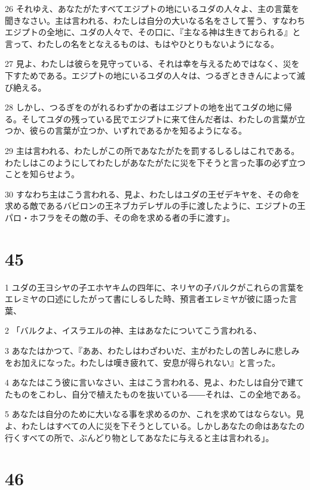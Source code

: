 \par 26 それゆえ、あなたがたすべてエジプトの地にいるユダの人々よ、主の言葉を聞きなさい。主は言われる、わたしは自分の大いなる名をさして誓う、すなわちエジプトの全地に、ユダの人々で、その口に、『主なる神は生きておられる』と言って、わたしの名をとなえるものは、もはやひとりもないようになる。
\par 27 見よ、わたしは彼らを見守っている、それは幸を与えるためではなく、災を下すためである。エジプトの地にいるユダの人々は、つるぎとききんによって滅び絶える。
\par 28 しかし、つるぎをのがれるわずかの者はエジプトの地を出てユダの地に帰る。そしてユダの残っている民でエジプトに来て住んだ者は、わたしの言葉が立つか、彼らの言葉が立つか、いずれであるかを知るようになる。
\par 29 主は言われる、わたしがこの所であなたがたを罰するしるしはこれである。わたしはこのようにしてわたしがあなたがたに災を下そうと言った事の必ず立つことを知らせよう。
\par 30 すなわち主はこう言われる、見よ、わたしはユダの王ゼデキヤを、その命を求める敵であるバビロンの王ネブカデレザルの手に渡したように、エジプトの王パロ・ホフラをその敵の手、その命を求める者の手に渡す」。

\chapter{45}

\par 1 ユダの王ヨシヤの子エホヤキムの四年に、ネリヤの子バルクがこれらの言葉をエレミヤの口述にしたがって書にしるした時、預言者エレミヤが彼に語った言葉、
\par 2 「バルクよ、イスラエルの神、主はあなたについてこう言われる、
\par 3 あなたはかつて、『ああ、わたしはわざわいだ、主がわたしの苦しみに悲しみをお加えになった。わたしは嘆き疲れて、安息が得られない』と言った。
\par 4 あなたはこう彼に言いなさい、主はこう言われる、見よ、わたしは自分で建てたものをこわし、自分で植えたものを抜いている――それは、この全地である。
\par 5 あなたは自分のために大いなる事を求めるのか、これを求めてはならない。見よ、わたしはすべての人に災を下そうとしている。しかしあなたの命はあなたの行くすべての所で、ぶんどり物としてあなたに与えると主は言われる」。

\chapter{46}

